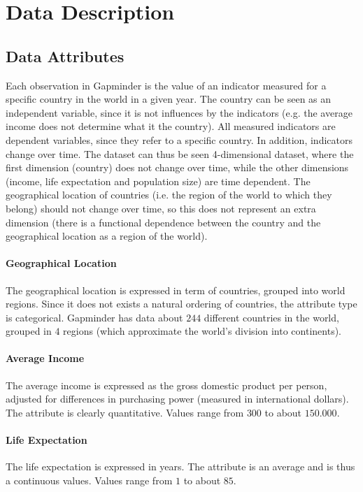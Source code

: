\section{Data Description}
\label{sec:data}

\subsection{Data Attributes}
Each observation in Gapminder is the value of an indicator measured for a specific country in the world in a given year.
The country can be seen as an independent variable, since it is not influences by the indicators (e.g. the average income does not determine what it the country).
All measured indicators are dependent variables, since they refer to a specific country.
In addition, indicators change over time.
The dataset can thus be seen 4-dimensional dataset, where the first dimension (country) does not change over time, while the other dimensions (income, life expectation and population size) are time dependent.
The geographical location of countries (i.e. the region of the world to which they belong) should not change over time, so this does not represent an extra dimension (there is a functional dependence between the country and the geographical location as a region of the world).

\paragraph{Geographical Location}
The geographical location is expressed in term of countries, grouped into world regions.
Since it does not exists a natural ordering of countries, the attribute type is categorical.
Gapminder has data about $244$ different countries in the world, grouped in $4$ regions (which approximate the world's division into continents).

\paragraph{Average Income}
The average income is expressed as the gross domestic product per person, adjusted for differences in purchasing power (measured in international dollars).
The attribute is clearly quantitative.
Values range from $300$ to about $150.000$.

\paragraph{Life Expectation}
The life expectation is expressed in years.
The attribute is an average and is thus a continuous values. 
Values range from $1$ to about $85$.

